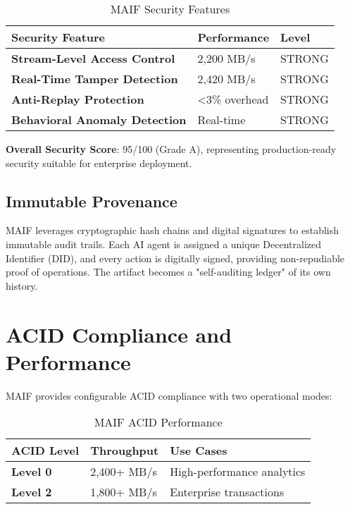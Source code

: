 \documentclass[conference]{IEEEtran}
\begin{document}
\begin{table}[!t]
\renewcommand{\arraystretch}{1.3}
\caption{MAIF Security Features}
\label{tab:security}
\centering
\footnotesize
\begin{tabular}{p{3.5cm}p{2.5cm}p{2cm}}
\toprule
\textbf{Security Feature} & \textbf{Performance} & \textbf{Level} \\
\midrule
\textbf{Stream-Level Access Control} & 2,200 MB/s & STRONG \\
\textbf{Real-Time Tamper Detection} & 2,420 MB/s & STRONG \\
\textbf{Anti-Replay Protection} & <3\% overhead & STRONG \\
\textbf{Behavioral Anomaly Detection} & Real-time & STRONG \\
\bottomrule
\end{tabular}
\end{table}

\textbf{Overall Security Score}: 95/100 (Grade A), representing production-ready security suitable for enterprise deployment.

\subsection{Immutable Provenance}

MAIF leverages cryptographic hash chains and digital signatures to establish immutable audit trails. Each AI agent is assigned a unique Decentralized Identifier (DID), and every action is digitally signed, providing non-repudiable proof of operations. The artifact becomes a "self-auditing ledger" of its own history.

\section{ACID Compliance and Performance}

MAIF provides configurable ACID compliance with two operational modes:

\begin{table}[!t]
\renewcommand{\arraystretch}{1.3}
\caption{MAIF ACID Performance}
\label{tab:acid}
\centering
\footnotesize
\begin{tabular}{p{2.5cm}p{2.5cm}p{3cm}}
\toprule
\textbf{ACID Level} & \textbf{Throughput} & \textbf{Use Cases} \\
\midrule
\textbf{Level 0} & 2,400+ MB/s & High-performance analytics \\
\textbf{Level 2} & 1,800+ MB/s & Enterprise transactions \\
\bottomrule
\end{tabular}
\end{table}
\end{document}
